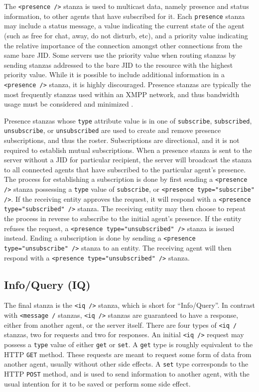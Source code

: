 The \texttt{<presence />} stanza is used to multicast data, namely presence
and status information, to other agents that have subscribed for it. Each
\texttt{presence} stanza may include a status message, a value indicating the
current state of the agent (such as free for chat, away, do not disturb, etc),
and a priority value indicating the relative importance of the connection
amongst other connections from the same bare JID. Some servers use the priority
value when routing stanzas by sending stanzas addressed to the bare JID
to the resource with the highest priority value. While it is possible to
include additional information in a \texttt{<presence />} stanza, it is highly
discouraged. Presence stanzas are typically the most frequently stanzas used
within an XMPP network, and thus bandwidth usage must be considered and
minimized \cite{RFC3921}.

Presence stanzas whose \texttt{type} attribute value is in one of
\texttt{subscribe}, \texttt{subscribed}, \texttt{unsubscribe}, or
\texttt{unsubscribed} are used to create and remove presence subscriptions,
and thus the roster. Subscriptions are directional, and it is not required
to establish mutual subscriptions. When a presence stanza is sent to the
server without a JID for particular recipient, the server will broadcast
the stanza to all connected agents that have subscribed to the particular
agent's presence. The process for establishing a subscription is done by
first sending a \texttt{<presence />} stanza possessing a \texttt{type} value
of \texttt{subscribe}, or \texttt{<presence type="subscribe" />}. If the
receiving entity approves the request, it will respond with a \texttt{<presence
type="subscribed" />} stanza. The receiving entity may then choose to repeat
the process in reverse to subscribe to the initial agent's presence. If the
entity refuses the request, a \texttt{<presence type="unsubscribed" />} stanza
is issued instead. Ending a subscription is done by sending a \texttt{<presence
type="unsubscribe" />} stanza to an entity. The receiving agent will then
respond with a \texttt{<presence type="unsubscribed" />} stanza.


\subsection{Info/Query (IQ)}
\label{sec:Iq}

The final stanza is the \texttt{<iq />} stanza, which is short for
``Info/Query''. In contrast with \texttt{<message /} stanzas, \texttt{<iq
/>} stanzas are guaranteed to have a response, either from another agent, or
the server itself. There are four types of \texttt{<iq /} stanzas, two for
requests and two for responses. An initial \texttt{<iq />} request may possess a
\texttt{type} value of either \texttt{get} or \texttt{set}. A \texttt{get} type
is roughly equivalent to the HTTP \texttt{GET} method. These requests are meant
to request some form of data from another agent, usually without other side
effects. A \texttt{set} type corresponds to the HTTP \texttt{POST} method, and
is used to send information to another agent, with the usual intention for it to
be saved or perform some side effect.

